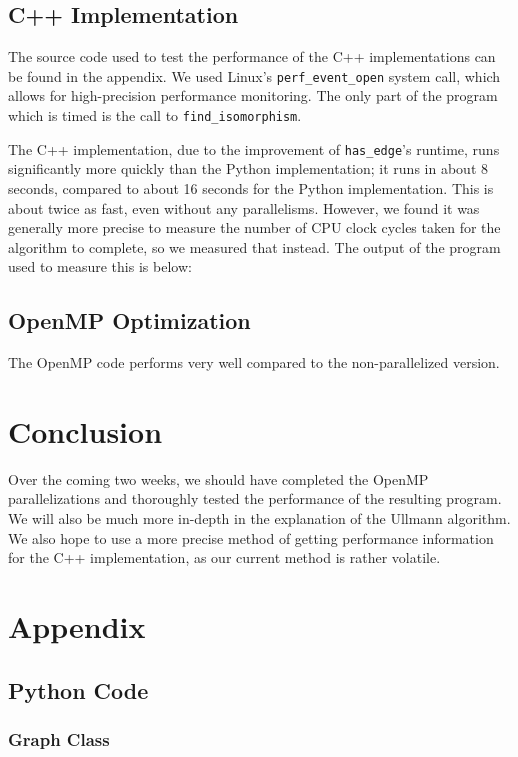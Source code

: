 \documentclass{article}
\begin{document}
  \subsection{C++ Implementation}
  The source code used to test the performance of the C++ implementations can be found in the appendix. We used Linux's \texttt{perf\_event\_open} system call, which allows for high-precision performance monitoring. The only part of the program which is timed is the call to \texttt{find\_isomorphism}.

  The C++ implementation, due to the improvement of \texttt{has\_edge}'s runtime, runs significantly more quickly than the Python implementation; it runs in about 8 seconds, compared to about 16 seconds for the Python implementation. This is about twice as fast, even without any parallelisms. However, we found it was generally more precise to measure the number of CPU clock cycles taken for the algorithm to complete, so we measured that instead. The output of the program used to measure this is below:

  \subsection{OpenMP Optimization}
  The OpenMP code performs very well compared to the non-parallelized version.

\section{Conclusion}
  Over the coming two weeks, we should have completed the OpenMP parallelizations and thoroughly tested the performance of the resulting program. We will also be much more in-depth in the explanation of the Ullmann algorithm. We also hope to use a more precise method of getting performance information for the C++ implementation, as our current method is rather volatile.

\section{Appendix}
  \subsection{Python Code}
    \subsubsection{Graph Class}
      
\end{document}
